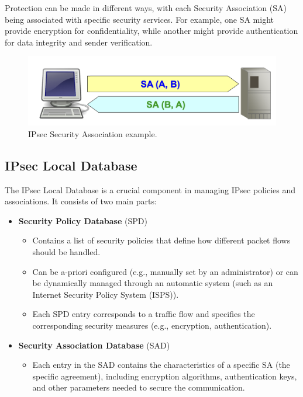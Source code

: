 \begin{tcolorbox}[colback=lightblue] 
    Protection can be made in different ways, with each Security Association (SA) being associated with specific security services. For example, one SA might provide encryption for confidentiality, while another might provide authentication for data integrity and sender verification. 
\end{tcolorbox}


\begin{figure}[H]
    \centering
    \includegraphics[width=0.5\linewidth]{Images/NetSec/SA.png}
    \caption{IPsec Security Association example.}
\end{figure}

\subsection{IPsec Local Database}

The IPsec Local Database is a crucial component in managing IPsec policies and associations. It consists of two main parts:

\begin{itemize}
    \item \textbf{Security Policy Database} (SPD)
    \begin{itemize}
        \item Contains a list of security policies that define how different packet flows should be handled.
        \item Can be a-priori configured (e.g., manually set by an administrator) or can be dynamically managed through an automatic system (such as an Internet Security Policy System (ISPS)).
        \item Each SPD entry corresponds to a traffic flow and specifies the corresponding security measures (e.g., encryption, authentication).
    \end{itemize}
    \item \textbf{Security Association Database} (SAD)
    \begin{itemize}
        \item Each entry in the SAD contains the characteristics of a specific SA (the specific agreement), including encryption algorithms, authentication keys, and other parameters needed to secure the communication.
    \end{itemize}
\end{itemize}

